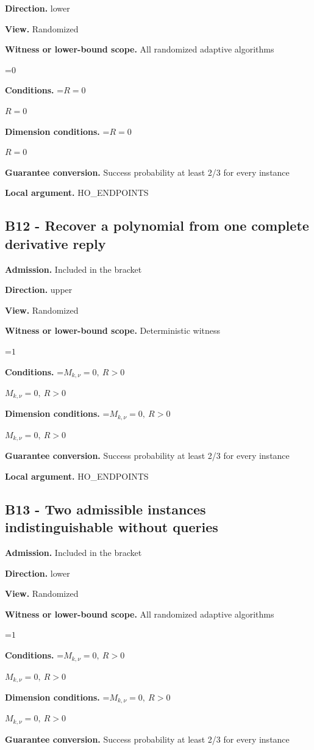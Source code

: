 \documentclass[10pt,a4paper]{article}
\newcommand{\AtlasMath}[1]{\par\begingroup\centering\setbox0=\hbox{$\displaystyle #1$}\ifdim\wd0>1.4\linewidth\typeout{ATLAS WIDE FORMULA: \the\wd0}\fi\ifdim\wd0>\linewidth\resizebox{\linewidth}{!}{\box0}\else\box0\fi\par\endgroup}
\newcommand{\AtlasInlineMath}[1]{\begingroup\setbox0=\hbox{$#1$}\ifdim\wd0>.4\linewidth\endgroup\AtlasMath{#1}\else\endgroup$#1$\fi}
\begin{document}
\textbf{Direction.} lower

\textbf{View.} Randomized

\textbf{Witness or lower-bound scope.} All randomized adaptive algorithms

\AtlasMath{0}
\textbf{Conditions.} \AtlasInlineMath{R=0}

\textbf{Dimension conditions.} \AtlasInlineMath{R=0}

\textbf{Guarantee conversion.} Success probability at least 2/3 for every instance

\textbf{Local argument.} HO\_\allowbreak{}ENDPOINTS

\subsection{B12 - Recover a polynomial from one complete derivative reply}
\textbf{Admission.} Included in the bracket

\textbf{Direction.} upper

\textbf{View.} Randomized

\textbf{Witness or lower-bound scope.} Deterministic witness

\AtlasMath{1}
\textbf{Conditions.} \AtlasInlineMath{M_{k,\nu}=0,\ R>0}

\textbf{Dimension conditions.} \AtlasInlineMath{M_{k,\nu}=0,\ R>0}

\textbf{Guarantee conversion.} Success probability at least 2/3 for every instance

\textbf{Local argument.} HO\_\allowbreak{}ENDPOINTS

\subsection{B13 - Two admissible instances indistinguishable without queries}
\textbf{Admission.} Included in the bracket

\textbf{Direction.} lower

\textbf{View.} Randomized

\textbf{Witness or lower-bound scope.} All randomized adaptive algorithms

\AtlasMath{1}
\textbf{Conditions.} \AtlasInlineMath{M_{k,\nu}=0,\ R>0}

\textbf{Dimension conditions.} \AtlasInlineMath{M_{k,\nu}=0,\ R>0}

\textbf{Guarantee conversion.} Success probability at least 2/3 for every instance
\end{document}
